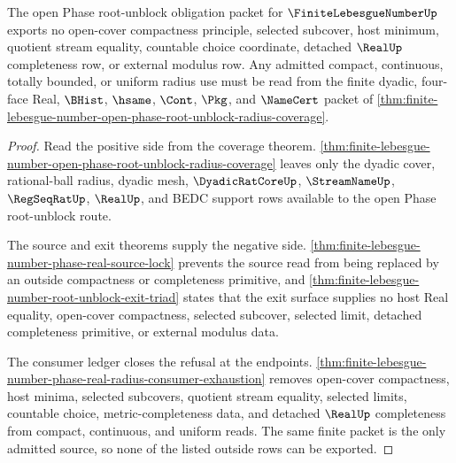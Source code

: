 \begin{theorem}
\label{thm:finite-lebesgue-number-open-phase-root-unblock-choice-refusal}
The open Phase root-unblock obligation packet for $\FiniteLebesgueNumberUp$ exports no open-cover compactness principle, selected subcover, host minimum, quotient stream equality, countable choice coordinate, detached $\RealUp$ completeness row, or external modulus row. Any admitted compact, continuous, totally bounded, or uniform radius use must be read from the finite dyadic, four-face Real, $\BHist$, $\hsame$, $\Cont$, $\Pkg$, and $\NameCert$ packet of \autoref{thm:finite-lebesgue-number-open-phase-root-unblock-radius-coverage}.
\end{theorem}
\begin{proof}
Read the positive side from the coverage theorem. \autoref{thm:finite-lebesgue-number-open-phase-root-unblock-radius-coverage} leaves only the dyadic cover, rational-ball radius, dyadic mesh, $\DyadicRatCoreUp$, $\StreamNameUp$, $\RegSeqRatUp$, $\RealUp$, and BEDC support rows available to the open Phase root-unblock route.

The source and exit theorems supply the negative side. \autoref{thm:finite-lebesgue-number-phase-real-source-lock} prevents the source read from being replaced by an outside compactness or completeness primitive, and \autoref{thm:finite-lebesgue-number-root-unblock-exit-triad} states that the exit surface supplies no host Real equality, open-cover compactness, selected subcover, selected limit, detached completeness primitive, or external modulus data.

The consumer ledger closes the refusal at the endpoints. \autoref{thm:finite-lebesgue-number-phase-real-radius-consumer-exhaustion} removes open-cover compactness, host minima, selected subcovers, quotient stream equality, selected limits, countable choice, metric-completeness data, and detached $\RealUp$ completeness from compact, continuous, and uniform reads. The same finite packet is the only admitted source, so none of the listed outside rows can be exported.
\end{proof}

